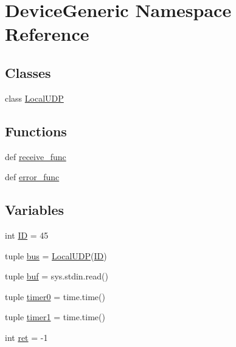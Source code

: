 \hypertarget{namespaceDeviceGeneric}{\section{Device\-Generic Namespace Reference}
\label{namespaceDeviceGeneric}
}
\subsection*{Classes}
\begin{DoxyCompactItemize}
\item 
class \hyperlink{classDeviceGeneric_1_1LocalUDP}{Local\-U\-D\-P}
\end{DoxyCompactItemize}
\subsection*{Functions}
\begin{DoxyCompactItemize}
\item 
def \hyperlink{namespaceDeviceGeneric_a740180b8e7ba2291a07d9624fa8ec3c7}{receive\-\_\-func}
\item 
def \hyperlink{namespaceDeviceGeneric_a96f1d3b4a85bc641b50c041a12efa461}{error\-\_\-func}
\end{DoxyCompactItemize}
\subsection*{Variables}
\begin{DoxyCompactItemize}
\item 
int \hyperlink{namespaceDeviceGeneric_a40607bde9a8451d26d9e95c719722c14}{I\-D} = 45
\item 
tuple \hyperlink{namespaceDeviceGeneric_a010654b8344442fdb38cdad434bb91b6}{bus} = \hyperlink{classDeviceGeneric_1_1LocalUDP}{Local\-U\-D\-P}(\hyperlink{namespaceDeviceGeneric_a40607bde9a8451d26d9e95c719722c14}{I\-D})
\item 
tuple \hyperlink{namespaceDeviceGeneric_a71165b95b92225bdd6d08b826c521c8b}{buf} = sys.\-stdin.\-read()
\item 
tuple \hyperlink{namespaceDeviceGeneric_abd02f36eb5b20b6fcd71492463785563}{timer0} = time.\-time()
\item 
tuple \hyperlink{namespaceDeviceGeneric_a8d2a2f778d4e748f1bd1b6c3d91d8a46}{timer1} = time.\-time()
\item 
int \hyperlink{namespaceDeviceGeneric_a8c6074f36f68d72fd1c72fcb62cca169}{ret} = -\/1
\end{DoxyCompactItemize}


